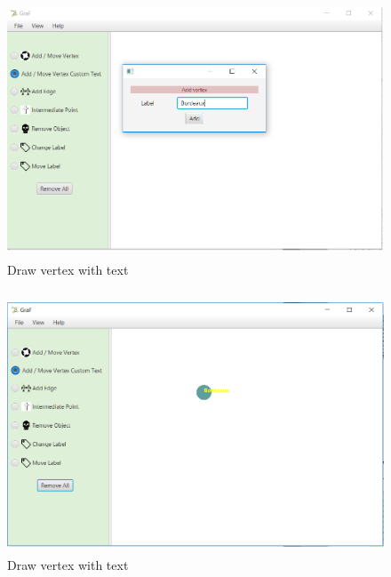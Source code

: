 \documentclass[a4paper,10pt]{article}
\begin{document}
	\paragraph{}
	
\begin{figure}[H]
		\centering
		\includegraphics[height = 3in]{drawVertexWithText.png}
		\caption[Optional caption]{Draw vertex with text}
		\label{fig:Repository}
	\end{figure}
\paragraph{}
\begin{figure}[H]
		\centering
		\includegraphics[height = 3in]{drawVertexWithText2.png}
		\caption[Optional caption]{Draw vertex with text}
		\label{fig:Repository}
	\end{figure}
%
\end{document}
